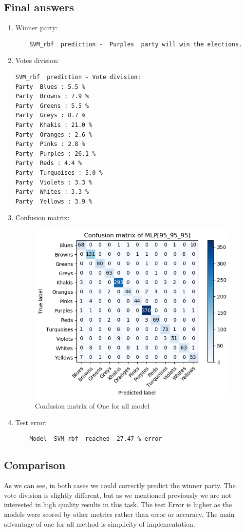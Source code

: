 \documentclass[12pt]{article}
\begin{document}
\subsection{Final answers}
\begin{enumerate}
\item Winner party:
	\begin{verbatim}
	SVM_rbf  prediction -  Purples  party will win the elections.
	\end{verbatim}
\item Votes division:
	\begin{verbatim}
SVM_rbf  prediction - Vote division:
Party  Blues : 5.5 %
Party  Browns : 7.9 %
Party  Greens : 5.5 %
Party  Greys : 8.7 %
Party  Khakis : 21.0 %
Party  Oranges : 2.6 %
Party  Pinks : 2.8 %
Party  Purples : 26.1 %
Party  Reds : 4.4 %
Party  Turquoises : 5.0 %
Party  Violets : 3.3 %
Party  Whites : 3.3 %
Party  Yellows : 3.9 %
	\end{verbatim}
\item Confusion matrix:
	\begin{figure}[htp]
	\centering
	\includegraphics[width=.5\textwidth]{confusion_matrix/confusion_fig_one_for_all}
	\caption{Confusion matrix of One for all model}
	\end{figure}
\item Test error:
	\begin{verbatim}
	Model  SVM_rbf  reached  27.47 % error
	\end{verbatim}
\end{enumerate}

\subsection{Comparison}
As we can see, in both cases we could correctly predict the winner party. The vote division is slightly different, but as we mentioned previously we are not interested in high quality results in this task. The test Error is higher as the models were scored by other metrics rather than error or accuracy. The main advantage of one for all method is simplicity of implementation.
\end{document}
